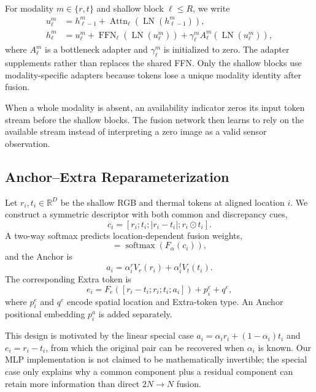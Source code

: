 \documentclass[10pt,twocolumn,letterpaper]{article}
\newcommand{\R}{\mathbb{R}}
\begin{document}
For modality $m\in\{r,t\}$ and shallow block $\ell\le R$, we write
\begin{align}
u^m_\ell &= h^m_{\ell-1}+\operatorname{Attn}_\ell(\operatorname{LN}(h^m_{\ell-1})),\\
h^m_\ell &= u^m_\ell+\operatorname{FFN}_\ell(\operatorname{LN}(u^m_\ell))
 +\gamma^m_\ell A^m_\ell(\operatorname{LN}(u^m_\ell)),
\end{align}
where $A^m_\ell$ is a bottleneck adapter and $\gamma^m_\ell$ is initialized to zero.
The adapter supplements rather than replaces the shared FFN.
Only the shallow blocks use modality-specific adapters because tokens lose a unique modality identity after fusion.

When a whole modality is absent, an availability indicator zeros its input token stream before the shallow blocks.
The fusion network then learns to rely on the available stream instead of interpreting a zero image as a valid sensor observation.

\subsection{Anchor--Extra Reparameterization}
\label{sec:anchor-extra}

Let $r_i,t_i\in\R^D$ be the shallow RGB and thermal tokens at aligned location $i$.
We construct a symmetric descriptor with both common and discrepancy cues,
\begin{equation}
c_i=[r_i;t_i;|r_i-t_i|;r_i\odot t_i].
\end{equation}
A two-way softmax predicts location-dependent fusion weights,
\begin{equation}
[\alpha_i^r,\alpha_i^t]=\operatorname{softmax}(F_{\alpha}(c_i)),
\end{equation}
and the Anchor is
\begin{equation}
a_i=\alpha_i^rV_r(r_i)+\alpha_i^tV_t(t_i).
\label{eq:anchor}
\end{equation}
The corresponding Extra token is
\begin{equation}
e_i=F_e([r_i-t_i;r_i;t_i;a_i])+p_i^e+q^e,
\label{eq:extra}
\end{equation}
where $p_i^e$ and $q^e$ encode spatial location and Extra-token type.
An Anchor positional embedding $p_i^a$ is added separately.

This design is motivated by the linear special case $a_i=\alpha_i r_i+(1-\alpha_i)t_i$ and $e_i=r_i-t_i$, from which the original pair can be recovered when $\alpha_i$ is known.
Our MLP implementation is not claimed to be mathematically invertible; the special case only explains why a common component plus a residual component can retain more information than direct $2N\rightarrow N$ fusion.
\end{document}
